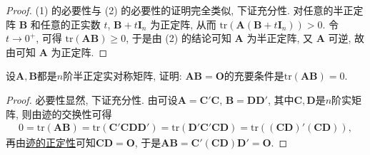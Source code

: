 \documentclass[../../main.tex]{subfiles}
\begin{document}
\begin{proof}
(1) 的必要性与 (2) 的必要性的证明完全类似, 下证充分性. 对任意的半正定阵 \(\boldsymbol{B}\) 和任意的正实数 \(t\), \(\boldsymbol{B}+t\boldsymbol{I}_n\) 为正定阵, 从而 \(\mathrm{tr}(\boldsymbol{A}(\boldsymbol{B}+t\boldsymbol{I}_n))>0\). 令 \(t\to0^+\), 可得 \(\mathrm{tr}(\boldsymbol{A}\boldsymbol{B})\geq0\), 于是由 (2) 的结论可知 \(\boldsymbol{A}\) 为半正定阵, 又 \(\boldsymbol{A}\) 可逆, 故由可知 \(\boldsymbol{A}\) 为正定阵.
\end{proof}

\begin{proposition}\label{proposition:A为实半正定阵AB=O的充要条件为tr(AB)=0}
设$\boldsymbol{A}, \boldsymbol{B}$都是$n$阶半正定实对称矩阵, 证明: $\boldsymbol{A}\boldsymbol{B}=\boldsymbol{O}$的充要条件是$\text{tr}(\boldsymbol{A}\boldsymbol{B}) = 0$.
\end{proposition}
\begin{proof}
必要性显然, 下证充分性. 由可设$\boldsymbol{A}=\boldsymbol{C}'\boldsymbol{C}$, $\boldsymbol{B}=\boldsymbol{D}\boldsymbol{D}'$, 其中$\boldsymbol{C}, \boldsymbol{D}$是$n$阶实矩阵, 则由迹的交换性可得
\begin{align*}
0 = \text{tr}(\boldsymbol{A}\boldsymbol{B}) = \text{tr}(\boldsymbol{C}'\boldsymbol{C}\boldsymbol{D}\boldsymbol{D}') = \text{tr}(\boldsymbol{D}'\boldsymbol{C}'\boldsymbol{C}\boldsymbol{D}) = \text{tr}\left((\boldsymbol{C}\boldsymbol{D})'(\boldsymbol{C}\boldsymbol{D})\right),
\end{align*}
再由\hyperref[proposition:零矩阵的充要条件]{迹的正定性}可知$\boldsymbol{C}\boldsymbol{D}=\boldsymbol{O}$, 于是$\boldsymbol{A}\boldsymbol{B}=\boldsymbol{C}'(\boldsymbol{C}\boldsymbol{D})\boldsymbol{D}'=\boldsymbol{O}$. 
\end{proof}
\end{document}
